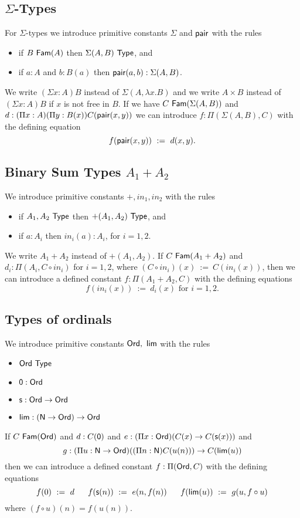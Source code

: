 \subsection*{$\Sigma$-Types}
For $\Sigma$-types we introduce primitive constants $\Sigma$ and ${\sf pair}$ with the rules
\begin{itemize}
\item if $B~{\sf Fam}(A)$ then $\Sigma(A,B)~{\sf Type}$, and
\item if $a:A$ and $b:B(a)$ then ${\sf pair}(a,b):\Sigma(A,B)$.
\end{itemize}
We write $(\Sigma x:A)B$ instead
of $\Sigma(A,\lambda x.B)$ and we write $A\times B$ instead of $(\Sigma x:A)B$ if
$x$ is not free in $B$.  If we have $C~{\sf Fam}(\Sigma(A,B))$ and
$
d:(\Pi x:A)(\Pi y:B(x))C({\sf pair}(x,y))
$
we can introduce $f:\Pi(\Sigma(A,B),C)$ with the defining equation
$$
f({\sf pair}(x,y))~:=~d(x,y).
$$

\medskip

\subsection*{Binary Sum Types $A_1+A_2$}
We introduce primitive constants $+,in_1,in_2$ with the rules
\begin{itemize}
\item if $A_1,A_2~{\sf Type}$ then $+(A_1,A_2)~{\sf Type}$, and
\item if $a:A_i$ then $in_i(a):A_i$, for $i=1,2$.
\end{itemize}
We write $A_1+A_2$ instead of $+(A_1,A_2)$.
If $C~{\sf Fam}(A_1+A_2)$ and $d_i:\Pi(A_i,C\circ in_i)$ for $i=1,2$, where 
$(C\circ in_i)(x)~:=~C(in_i(x))$, then we can introduce a defined constant $f:\Pi(A_1+A_2,C)$ with the defining equations
  \[ f(in_i(x))~:= ~d_i(x)\mbox{ for } i=1,2.\]

\subsection*{Types of ordinals}
We introduce primitive constants ${\sf Ord},~{\sf lim}$ with the rules
\begin{itemize}
\item ${\sf Ord}~{\sf Type}$
\item ${\sf 0}:{\sf Ord}$
\item ${\sf s}:{\sf Ord}\rightarrow{\sf Ord}$
\item ${\sf lim}:({\sf N}\rightarrow{\sf Ord})\rightarrow{\sf Ord}$
\end{itemize}
If $C~{\sf Fam}({\sf Ord})$ and $d:C({\sf 0})$ and $e:(\Pi x:{\sf Ord})(C(x)\rightarrow C({\sf s}(x)))$ and
$$g:(\Pi u:{\sf N}\rightarrow{\sf Ord})((\Pi n:{\sf N})C(u(n)))\rightarrow C({\sf lim}(u))$$
then we can introduce a defined constant $f:\Pi({\sf Ord},C)$ with the defining equations
$$
f(0) ~:=~ d~~~~~f({\sf s}(n)) ~:=~ e(n,f(n))~~~~~f({\sf lim}(u)) ~:=~ g(u,f\circ u)
$$
where $(f\circ u)(n) = f(u(n))$.

